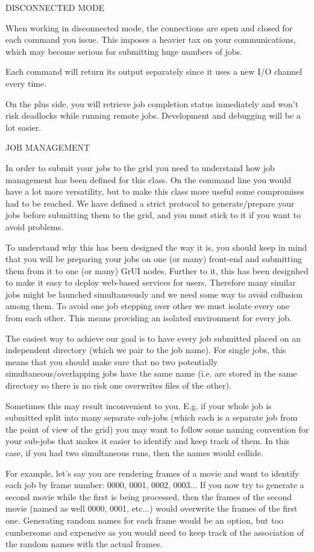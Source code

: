 DISCONNECTED MODE

When working in disconnected mode, the connections are open and closed for each command you issue. This imposes a heavier tax on your communications, which may become serious for submitting huge numbers of jobs.

Each command will return its output separately since it uses a new I/O channel every time.

On the plus side, you will retrieve job completion status inmediately and won't risk deadlocks while running remote jobs. Development and debugging will be a lot easier.

JOB MANAGEMENT

In order to submit your jobs to the grid you need to understand how job management has been defined for this class. On the command line you would have a lot more versatility, but to make this class more useful some compromises had to be reached. We have defined a strict protocol to generate/prepare your jobs before submitting them to the grid, and you must stick to it if you want to avoid problems.

To understand why this has been designed the way it is, you should keep in mind that you will be preparing your jobs on one (or many) front-end and submitting them from it to one (or many) Gr\-UI nodes. Further to it, this has been designhed to make it easy to deploy web-based services for users. Therefore many similar jobs might be launched simultaneously and we need some way to avoid collusion among them. To avoid one job stepping over other we must isolate every one from each other. This means providing an isolated environment for every job.

The easiest way to achieve our goal is to have every job submitted placed on an independent directory (which we pair to the job name). For single jobs, this means that you should make sure that no two potentially simultaneous/overlapping jobs have the same name (i.e. are stored in the same directory so there is no risk one overwrites files of the other).

Sometimes this may result inconvenient to you. E.g. if your whole job is submitted split into many separate sub-jobs (which each is a separate job from the point of view of the grid) you may want to follow some naming convention for your sub-jobs that makes it easier to identify and keep track of them. In this case, if you had two simultaneous runs, then the names would collide.

For example, let's say you are rendering frames of a movie and want to identify each job by frame number: 0000, 0001, 0002, 0003... If you now try to generate a second movie while the first is being processed, then the frames of the second movie (named as well 0000, 0001, etc...) would overwrite the frames of the first one. Generating random names for each frame would be an option, but too cumbersome and expensive as you would need to keep track of the association of the random names with the actual frames.

